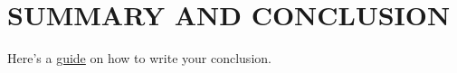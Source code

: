 
\section{SUMMARY AND CONCLUSION}
    Here's a \href{https://essay-lib.com/write-conclusion-research-paper/}{guide} on how to write your conclusion.
    \lipsum[4]